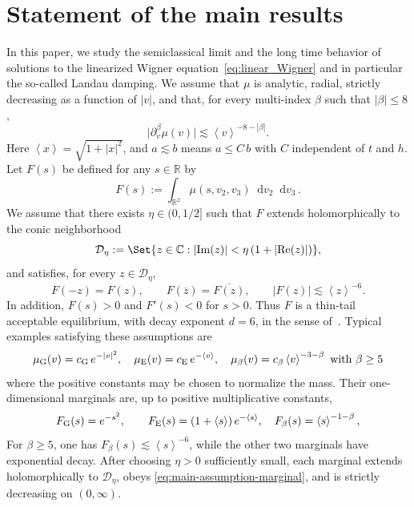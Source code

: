 \documentclass[a4paper,12pt]{amsart} %
\theoremstyle{plain}
\theoremstyle{definition}
\newcommand		{\RR}		{\mathbb R}			%
\newcommand		{\R}		{\RR}
\newcommand		{\CC}		{\mathbb C}			%
\newcommand		{\lt}			{\left}				%
\newcommand		{\rt}			{\right}			%
\renewcommand	{\(}			{\lt(}
\renewcommand	{\)}			{\rt)}
\newcommand		{\bangle}[1]	{\lt\langle #1\rt\rangle}
\newcommand		{\weight}[1]	{\bangle{#1}}	%
\newcommand		{\n}[1]			{\lt\lvert{#1}\rt\rvert}	%
\newcommand		{\sabs}[1]		{\lvert{#1}\rvert}
\renewcommand		{\d}		{\mathop{}\!\mathrm{d}}		%
\DeclareMathOperator{\re}		{Re}				%
\DeclareMathOperator{\im}		{Im}				%
\renewcommand	{\Re}[1]		{\re\!\( #1 \)}		%
\renewcommand	{\Im}[1]		{\im\!\( #1 \)}		%
\begin{document}
\section{Statement of the main results}
	In this paper, we study the semiclassical limit and the long time behavior of solutions to the linearized Wigner equation~\eqref{eq:linear_Wigner} and in particular the so-called Landau damping. We assume that $\mu$ is analytic, radial, strictly decreasing as a function of $\n{v}$, and that, for every multi-index $\beta$ such that $\n{\beta}\leq 8$,
	\begin{equation*}
		\sabs{\partial_v^\beta\mu(v)} \lesssim \weight{v}^{-8-\n{\beta}} .
	\end{equation*}
	Here $\weight{x} = \sqrt{1+\n{x}^2}$, and $a\lesssim b$ means $a\leq C\,b$ with $C$ independent of $t$ and $h$.\\
	
	Let $F(s)$ be defined for any $s\in\R$ by
	\begin{equation}\label{eq:marginal}
		F(s) := \int_{\R^2}\mu(s,v_2,v_3)\d v_2\d v_3 \, .
	\end{equation}
	We assume that there exists $\eta\in(0,1/2]$ such that $F$ extends
	holomorphically to the conic neighborhood
	\begin{equation}\label{eq:def_conic}
		\mathcal D_\eta
		:=\Set{z\in\CC:\n{\Im z}<\eta\lt(1+\n{\Re z}\rt)},
	\end{equation}
	and satisfies, for every $z\in\mathcal D_\eta$,
	\begin{equation}\label{eq:main-assumption-marginal}
		F(-z)=F(z),
		\qquad F(\overline z)=\overline{F(z)},
		\qquad \n{F(z)}\lesssim\weight{z}^{-6}.
	\end{equation}
	In addition, $F(s)>0$ and $F'(s)<0$ for $s>0$. Thus $F$ is a
	thin-tail acceptable equilibrium, with decay exponent $d=6$, in the
	sense of~\cite[Definition~1.1]{ionescu_stability_2023}.
	Typical examples satisfying these assumptions are
	\begin{equation}\label{eq:examples-admissible-equilibria}
		\mu_{\rm G}(v) = c_{\rm G}\, e^{-\n{v}^2} ,
		\quad
		\mu_{\rm E}(v) = c_{\rm E} \, e^{-\weight{v}} ,
		\quad
		\mu_\beta(v) = c_\beta\weight{v}^{-3-\beta} \text{ with }\beta\geq 5
	\end{equation}
	where the positive constants may be chosen to normalize the mass. Their
	one-dimensional marginals are, up to positive multiplicative constants,
	\begin{equation*}
		F_{\rm G}(s) = e^{-s^2},
		\qquad
		F_{\rm E}(s) = \lt(1+\weight{s}\rt)e^{-\weight{s}} ,
		\quad
		F_\beta(s) = \weight{s}^{-1-\beta},
	\end{equation*}
	For $\beta\geq5$, one has
	$F_\beta(s)\lesssim\weight{s}^{-6}$, while the other two marginals
	have exponential decay. After choosing $\eta>0$ sufficiently small,
	each marginal extends holomorphically to $\mathcal D_\eta$, obeys
	\eqref{eq:main-assumption-marginal}, and is strictly decreasing on
	$(0,\infty)$. 
\end{document}
